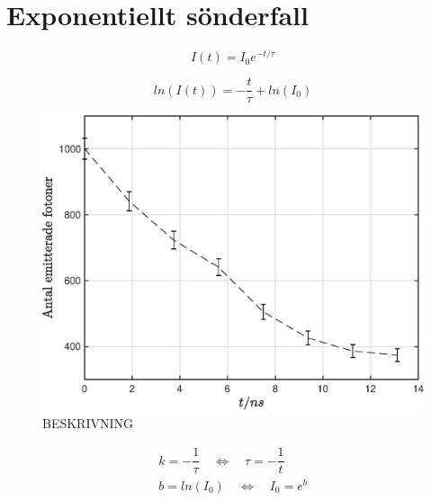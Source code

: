
\section*{\centering Exponentiellt sönderfall}

\begin{equation} \label{eq:I_t}
	I(t) = I_0e^{-t/\tau}
\end{equation}

\begin{equation} \label{eq:log_I}
	ln(I(t)) = -\dfrac{t}{\tau} + ln(I_0)
\end{equation}

\begin{figure}[H]
    \centering
    \captionsetup{justification=centering,margin=2cm}
    \includegraphics[scale=0.4]{Resources/Graphics/fig1_1.eps}
    \caption{BESKRIVNING}
    \label{fig:1_1}
\end{figure}

\begin{eqnarray*}
	k = -\dfrac{1}{\tau} \quad \Leftrightarrow \quad
	\tau = -\dfrac{1}{t} \\
	b = ln(I_0) \quad \Leftrightarrow \quad
	I_0 = e^{b}
\end{eqnarray*}

